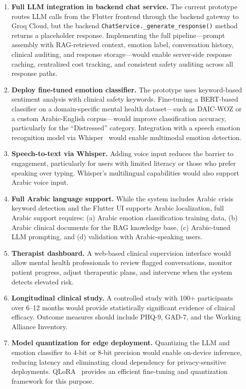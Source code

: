 \documentclass[12pt,a4paper,oneside,openany]{report}
\begin{document}
\begin{enumerate}[nosep]
\item \textbf{Full LLM integration in backend chat service.} The current prototype routes LLM calls from the Flutter frontend through the backend gateway to Groq Cloud, but the backend \texttt{ChatService.\_generate\_response()} method returns a placeholder response. Implementing the full pipeline---prompt assembly with RAG-retrieved context, emotion label, conversation history, clinical auditing, and response storage---would enable server-side response caching, centralized cost tracking, and consistent safety auditing across all response paths.
\item \textbf{Deploy fine-tuned emotion classifier.} The prototype uses keyword-based sentiment analysis with clinical safety keywords. Fine-tuning a BERT-based classifier on a domain-specific mental health dataset---such as DAIC-WOZ or a custom Arabic-English corpus---would improve classification accuracy, particularly for the ``Distressed'' category. Integration with a speech emotion recognition model via Whisper~\cite{radford2022whisper} would enable multimodal emotion detection.
\item \textbf{Speech-to-text via Whisper.} Adding voice input reduces the barrier to engagement, particularly for users with limited literacy or those who prefer speaking over typing. Whisper's multilingual capabilities would also support Arabic voice input.
\item \textbf{Full Arabic language support.} While the system includes Arabic crisis keyword detection and the Flutter UI supports Arabic localization, full Arabic support requires: (a) Arabic emotion classification training data, (b) Arabic clinical documents for the RAG knowledge base, (c) Arabic-tuned LLM prompting, and (d) validation with Arabic-speaking users.
\item \textbf{Therapist dashboard.} A web-based clinical supervision interface would allow mental health professionals to review flagged conversations, monitor patient progress, adjust therapeutic plans, and intervene when the system detects elevated risk.
\item \textbf{Longitudinal clinical study.} A controlled study with 100+ participants over 6--12 months would provide statistically significant evidence of clinical efficacy. Outcome measures should include PHQ-9, GAD-7, and the Working Alliance Inventory.
\item \textbf{Model quantization for edge deployment.} Quantizing the LLM and emotion classifier to 4-bit or 8-bit precision would enable on-device inference, reducing latency and eliminating cloud dependency for privacy-sensitive deployments. QLoRA~\cite{dettmers2022qlora} provides an efficient fine-tuning and quantization framework for this purpose.

\end{enumerate}
\end{document}
